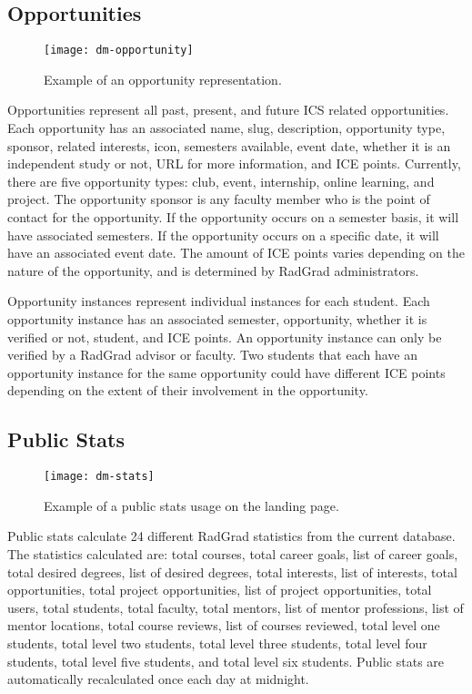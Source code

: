 \subsection{Opportunities}
\begin{figure}[h]
\centering
\texttt{[image: dm-opportunity]}
\caption{Example of an opportunity representation.}
\end{figure}
Opportunities represent all past, present, and future ICS related opportunities.  Each opportunity has an associated name, slug, description, opportunity type, sponsor, related interests, icon, semesters available, event date, whether it is an independent study or not, URL for more information, and ICE points. Currently, there are five opportunity types: club, event, internship, online learning, and project. The opportunity sponsor is any faculty member who is the point of contact for the opportunity. If the opportunity occurs on a semester basis, it will have associated semesters. If the opportunity occurs on a specific date, it will have an associated event date. The amount of ICE points varies depending on the nature of the opportunity, and is determined by RadGrad administrators. 

Opportunity instances represent individual instances for each student. Each opportunity instance has an associated semester, opportunity, whether it is verified or not, student, and ICE points. An opportunity instance can only be verified by a RadGrad advisor or faculty. Two students that each have an opportunity instance for the same opportunity could have different ICE points depending on the extent of their involvement in the opportunity.    

\subsection{Public Stats}
\begin{figure}[h]
\centering
\texttt{[image: dm-stats]}
\caption{Example of a public stats usage on the landing page.}
\end{figure}
Public stats calculate 24 different RadGrad statistics from the current database. The statistics calculated are: total courses, total career goals, list of career goals, total desired degrees, list of desired degrees, total interests, list of interests, total opportunities, total project opportunities, list of project opportunities, total users, total students, total faculty, total mentors, list of mentor professions, list of mentor locations, total course reviews, list of courses reviewed, total level one students, total level two students, total level three students, total level four students, total level five students, and total level six students. Public stats are automatically recalculated once each day at midnight. 


